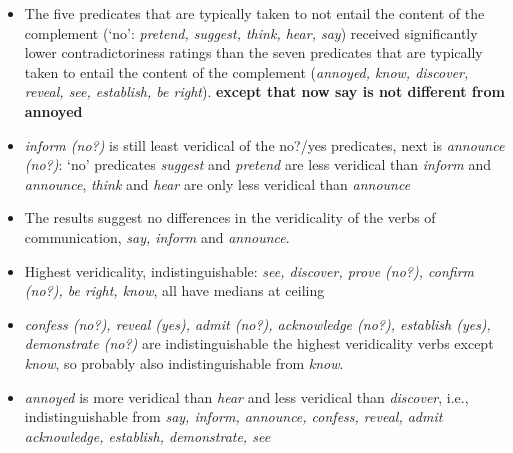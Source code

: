 \documentclass[11pt,fleqn]{article}
\newcommand{\6}{\mbox{$[\hspace*{-.6mm}[$}}
\newcommand{\9}{\mbox{$]\hspace*{-.6mm}]$}}
\begin{document}
\begin{itemize}

\item The five predicates that are typically taken to not entail the content of the complement (`no': {\em pretend, suggest, think, hear, say}) received significantly lower contradictoriness ratings than the seven predicates that are typically taken to entail the content of the complement ({\em annoyed, know, discover, reveal, see, establish, be right}). {\bf except that now say is not different from annoyed}

\item {\em inform (no?)} is still least veridical of the no?/yes predicates, next is {\em announce (no?)}: `no' predicates {\em suggest} and {\em pretend} are less veridical than {\em inform} and {\em announce}, {\em think} and {\em hear} are only less veridical than {\em announce}

\item The results suggest no differences in the veridicality of the verbs of communication, {\em say, inform} and {\em announce}. 

\item Highest veridicality, indistinguishable: {\em see, discover, prove (no?), confirm (no?), be right, know}, all have medians at ceiling

\item {\em confess (no?), reveal (yes), admit (no?), acknowledge (no?), establish (yes), demonstrate (no?)} are indistinguishable the highest veridicality verbs except {\em know}, so probably also indistinguishable from {\em know}.

\item {\em annoyed} is more veridical than {\em hear} and less veridical than {\em discover}, i.e., indistinguishable from {\em say, inform, announce, confess, reveal, admit acknowledge, establish, demonstrate, see}

\end{itemize}
\end{document}
